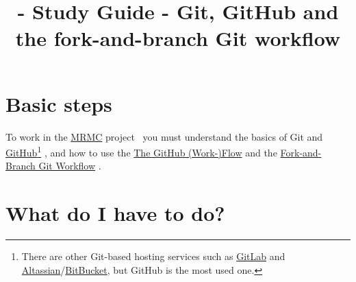 
\title{\SM{} - Study Guide - Git, GitHub and the fork-and-branch Git workflow}

\maketitle

\tableofcontents

\lstset{
  showstringspaces=false,
  upquote=true
}

\section{Basic steps}

To work in the
\href{https://github.com/Sistemas-Multimedia/MRVC}{MRMC}
project~\cite{MRVC} you must understand the basics of Git
\cite{Git-book} and \href{https://github.com/}{GitHub}\footnote{There
are other Git-based hosting services such as
\href{https://about.gitlab.com/}{GitLab} and
\href{https://www.atlassian.com/git}{Altassian}/\href{https://bitbucket.org/product}{BitBucket},
but GitHub is the most used one.} \cite{GitHub}, and how to use the
\href{https://guides.github.com/introduction/flow/index.html}{The
  GitHub (Work-)Flow} and the
\href{https://github.com/vicente-gonzalez-ruiz/fork_and_branch_git_workflow}{Fork-and-Branch
  Git Workflow} \cite{fork-and-branch-git-workflow}.

\section{What do I have to do?}

